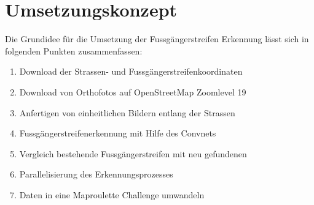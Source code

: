 \section{Umsetzungskonzept}
\label{sec:umsetzung}
Die Grundidee für die Umsetzung der Fussgängerstreifen Erkennung lässt sich in folgenden Punkten zusammenfassen:
\begin{enumerate}
	\item Download der Strassen- und Fussgängerstreifenkoordinaten
	\item Download von Orthofotos auf \Gls{OpenStreetMap} Zoomlevel 19
	\item Anfertigen von einheitlichen Bildern entlang der Strassen
	\item Fussgängerstreifenerkennung mit Hilfe des Convnets
	\item Vergleich bestehende Fussgängerstreifen mit neu gefundenen
	\item Parallelisierung des Erkennungsprozesses
	\item Daten in eine Maproulette Challenge umwandeln
\end{enumerate}







